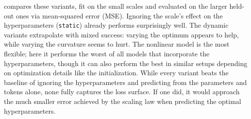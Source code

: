  compares these variants, fit on the small scales and evaluated on the larger held-out ones via mean-squared error (MSE). Ignoring the scale's effect on the hyperparameters (\texttt{static}) already performs surprisingly well. The dynamic variants extrapolate with mixed success: varying the optimum appears to help, while varying the curvature seems to hurt. The nonlinear model is the most flexible; here it performs the worst of all models that incorporate the hyperparameters, though it can also perform the best in similar setups depending on optimization details like the initialization. While every variant beats the baseline of ignoring the hyperparameters and predicting from the parameters and tokens alone, none fully captures the loss surface. If one did, it would approach the much smaller error achieved by the scaling law when predicting the optimal hyperparameters.
